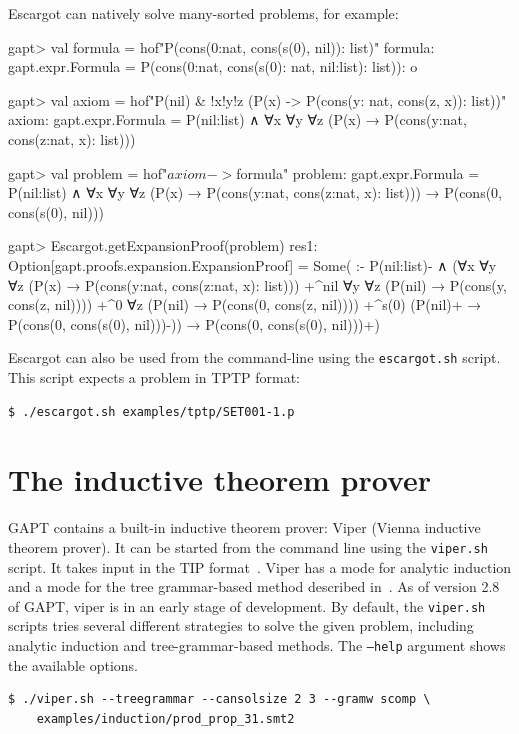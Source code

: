 \documentclass[a4paper,11pt]{book}
\newcommand{\cli}[1]{{\ttfamily {#1}}}
\begin{document}
Escargot can natively solve many-sorted problems, for example:
\begin{clilisting}
gapt> val formula = hof"P(cons(0:nat, cons(s(0), nil)): list)"
formula: gapt.expr.Formula = P(cons(0:nat, cons(s(0): nat, nil:list): list)): o

gapt> val axiom = hof"P(nil) & !x!y!z (P(x) -> P(cons(y: nat, cons(z, x)): list))"
axiom: gapt.expr.Formula = P(nil:list) ∧ ∀x ∀y ∀z (P(x) → P(cons(y:nat, cons(z:nat, x): list)))

gapt> val problem = hof"$axiom -> $formula"
problem: gapt.expr.Formula =
P(nil:list) ∧ ∀x ∀y ∀z (P(x) → P(cons(y:nat, cons(z:nat, x): list))) →
  P(cons(0, cons(s(0), nil)))

gapt> Escargot.getExpansionProof(problem)
res1: Option[gapt.proofs.expansion.ExpansionProof] =
Some(
:-
P(nil:list)- ∧
    (∀x ∀y ∀z (P(x) → P(cons(y:nat, cons(z:nat, x): list)))
      +^{nil}
        ∀y ∀z (P(nil) → P(cons(y, cons(z, nil))))
        +^{0}
          ∀z (P(nil) → P(cons(0, cons(z, nil))))
          +^{s(0)} (P(nil)+ → P(cons(0, cons(s(0), nil)))-)) →
  P(cons(0, cons(s(0), nil)))+)

\end{clilisting}


Escargot can also be used from the command-line using the \texttt{escargot.sh}
script.  This script expects a problem in TPTP format:
\begin{lstlisting}
$ ./escargot.sh examples/tptp/SET001-1.p
\end{lstlisting}

\section{The inductive theorem prover \cli{viper}}

GAPT contains a built-in inductive theorem prover: Viper (Vienna inductive theorem prover). It
can be started from the command line using the \texttt{viper.sh} script. It takes input in the
TIP format~\cite{Claessen15TIP}. Viper has a mode for analytic induction and a mode for 
the tree grammar-based method described in~\cite{Eberhard15Inductive}. As of version 2.8 of GAPT,
viper is in an early stage of development.  By default, the \texttt{viper.sh}
scripts tries several different strategies to solve the given problem,
including analytic induction and tree-grammar-based methods.  The
\texttt{--help} argument shows the available options.
\begin{lstlisting}
$ ./viper.sh --treegrammar --cansolsize 2 3 --gramw scomp \
    examples/induction/prod_prop_31.smt2
\end{lstlisting}
\end{document}
